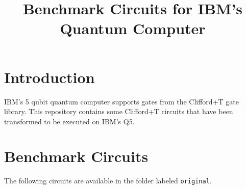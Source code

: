 \documentclass{article}
\begin{document}
\title{Benchmark Circuits for IBM's Quantum Computer}
\date{}
\maketitle

\section{Introduction}
IBM's 5 qubit quantum computer \cite{IBMQ} supports gates from the Clifford+T gate library. 
This repository contains some  Clifford+T circuits that have been transformed to be executed on IBM's Q5.

\section{Benchmark Circuits}

The following circuits are available in the folder labeled {\tt original}.
\vspace{5mm}
\end{document}
